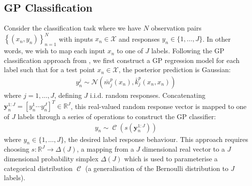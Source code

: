\documentclass{article}
\newcommand{\Cat}{\operatorname{\mathcal{C}}}
\numberwithin{equation}{section}
\begin{document}
\subsection{GP Classification}
Consider the classification task where we have $N$ observation pairs $\left\{(x_n, y_n)\right\}_{n=1}^{N}$ with inputs $x_n \in \mathcal{X}$ and responses $y_n \in \{1, \dots, J\}$. In other words, we wish to map each input $x_n$ to one of $J$ labels. Following the GP classification approach from \cite{matthews2017scalable}, we first construct a GP regression model for each label such that for a test point $x_n \in \mathcal{X}$, the posterior prediction is Gaussian:
\begin{align}
    y_n^j \sim \mathcal{N}\left(\bar{m}^p_j(x_n), \bar{k}^p_j(x_n, x_n)\right)
    \label{gp-classifier-regressors}
\end{align}
where $j=1, \dots, J$, defining $J$ i.i.d. random responses.
Concatenating $\mathbf{y}_n^{1:J} = [y_n^1 \cdots y_n^J]^T \in \mathbb{R}^{J}$, this real-valued random response vector is mapped to one of $J$ labels through a series of operations to construct the GP classifier:
\begin{align}
y_n \sim \Cat \left(s\left(\mathbf{y}_n^{1:J}\right)\right)
\label{gp-classifier}
\end{align}
where $y_n \in \{1, \dots, J\}$, the desired label response behaviour. This approach requires choosing $s: \mathbb{R}^J \rightarrow \Delta(J)$, a mapping from a $J$ dimensional real vector to a $J$ dimensional probability simplex $\Delta(J)$ which is used to parameterise a categorical distribution $\Cat$ (a generalisation of the Bernoulli distribution to $J$ labels).
\end{document}
